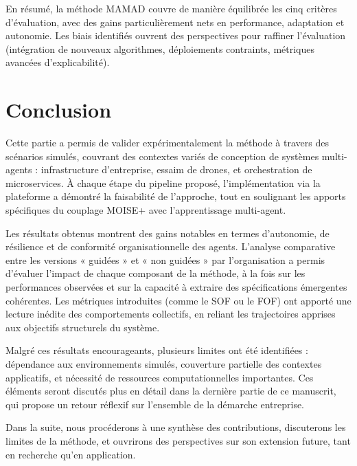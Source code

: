 \medskip
En résumé, la méthode MAMAD couvre de manière équilibrée les cinq critères d’évaluation, avec des gains particulièrement nets en performance, adaptation et autonomie. Les biais identifiés ouvrent des perspectives pour raffiner l’évaluation (intégration de nouveaux algorithmes, déploiements contraints, métriques avancées d’explicabilité).

\clearpage
\thispagestyle{empty}
\null
\newpage


\chapter*{Conclusion}

Cette partie a permis de valider expérimentalement la méthode  à travers des scénarios simulés, couvrant des contextes variés de conception de systèmes multi-agents : infrastructure d’entreprise, essaim de drones, et orchestration de microservices. À chaque étape du pipeline proposé, l’implémentation via la plateforme  a démontré la faisabilité de l’approche, tout en soulignant les apports spécifiques du couplage MOISE+ avec l’apprentissage multi-agent.

Les résultats obtenus montrent des gains notables en termes d’autonomie, de résilience et de conformité organisationnelle des agents. L’analyse comparative entre les versions « guidées » et « non guidées » par l’organisation a permis d’évaluer l’impact de chaque composant de la méthode, à la fois sur les performances observées et sur la capacité à extraire des spécifications émergentes cohérentes. Les métriques introduites (comme le SOF ou le FOF) ont apporté une lecture inédite des comportements collectifs, en reliant les trajectoires apprises aux objectifs structurels du système.

Malgré ces résultats encourageants, plusieurs limites ont été identifiées : dépendance aux environnements simulés, couverture partielle des contextes applicatifs, et nécessité de ressources computationnelles importantes. Ces éléments seront discutés plus en détail dans la dernière partie de ce manuscrit, qui propose un retour réflexif sur l’ensemble de la démarche entreprise.

\vspace{1em}

\noindent
Dans la suite, nous procéderons à une synthèse des contributions, discuterons les limites de la méthode, et ouvrirons des perspectives sur son extension future, tant en recherche qu’en application.
